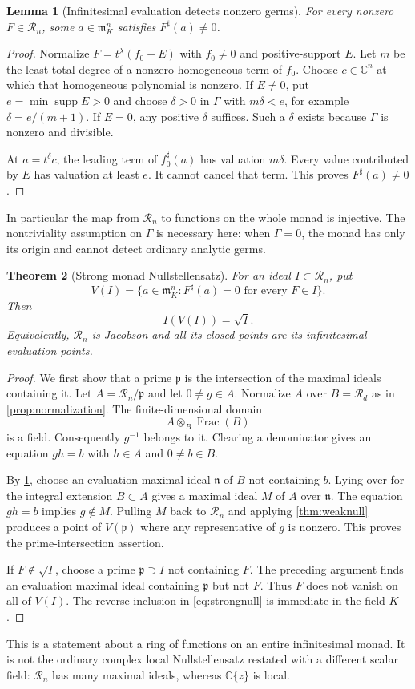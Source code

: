 \documentclass[11pt]{article}
\newtheorem{theorem}{Theorem}[section]
\newtheorem{lemma}[theorem]{Lemma}
\theoremstyle{definition}
\newcommand{\C}{\mathbb C}
\newcommand{\RR}{\mathscr R}
\newcommand{\mm}{\mathfrak m}
\newcommand{\pp}{\mathfrak p}
\newcommand{\supp}{\operatorname{supp}}
\newcommand{\Frac}{\operatorname{Frac}}
\newcommand{\sh}{^{\sharp}}
\begin{document}
\begin{lemma}[Infinitesimal evaluation detects nonzero germs]\label{lem:density}
For every nonzero $F\in\RR_n$, some $a\in\mm_K^n$ satisfies $F\sh(a)\ne0$.
\end{lemma}
\begin{proof}
Normalize $F=t^\lambda(f_0+E)$ with $f_0\ne0$ and positive-support $E$. Let $m$ be the least total degree of a nonzero homogeneous term of $f_0$. Choose $c\in\C^n$ at which that homogeneous polynomial is nonzero. If $E\ne0$, put $e=\min\supp E>0$ and choose $\delta>0$ in $\Gamma$ with $m\delta<e$, for example $\delta=e/(m+1)$. If $E=0$, any positive $\delta$ suffices. Such a $\delta$ exists because $\Gamma$ is nonzero and divisible.

At $a=t^\delta c$, the leading term of $f_0\sh(a)$ has valuation $m\delta$. Every value contributed by $E$ has valuation at least $e$. It cannot cancel that term. This proves $F\sh(a)\ne0$.
\end{proof}
In particular the map from $\RR_n$ to functions on the whole monad is injective. The nontriviality assumption on $\Gamma$ is necessary here: when $\Gamma=0$, the monad has only its origin and cannot detect ordinary analytic germs.

\begin{theorem}[Strong monad Nullstellensatz]\label{thm:strongnull}
For an ideal $I\subset\RR_n$, put
\[
 V(I)=\{a\in\mm_K^n:F\sh(a)=0\text{ for every }F\in I\}.
\]
Then
\begin{equation}\label{eq:strongnull}
 I(V(I))=\sqrt I.
\end{equation}
Equivalently, $\RR_n$ is Jacobson and all its closed points are its infinitesimal evaluation points.
\end{theorem}
\begin{proof}
We first show that a prime $\pp$ is the intersection of the maximal ideals containing it. Let $A=\RR_n/\pp$ and let $0\ne g\in A$. Normalize $A$ over $B=\RR_d$ as in \cref{prop:normalization}. The finite-dimensional domain
\[
 A\otimes_B\Frac(B)
\]
is a field. Consequently $g^{-1}$ belongs to it. Clearing a denominator gives an equation $gh=b$ with $h\in A$ and $0\ne b\in B$.

By \cref{lem:density}, choose an evaluation maximal ideal $\mathfrak n$ of $B$ not containing $b$. Lying over for the integral extension $B\subset A$ gives a maximal ideal $M$ of $A$ over $\mathfrak n$. The equation $gh=b$ implies $g\notin M$. Pulling $M$ back to $\RR_n$ and applying \cref{thm:weaknull} produces a point of $V(\pp)$ where any representative of $g$ is nonzero. This proves the prime-intersection assertion.

If $F\notin\sqrt I$, choose a prime $\pp\supset I$ not containing $F$. The preceding argument finds an evaluation maximal ideal containing $\pp$ but not $F$. Thus $F$ does not vanish on all of $V(I)$. The reverse inclusion in \eqref{eq:strongnull} is immediate in the field $K$.
\end{proof}
This is a statement about a ring of functions on an entire infinitesimal monad. It is not the ordinary complex local Nullstellensatz restated with a different scalar field: $\RR_n$ has many maximal ideals, whereas $\C\{z\}$ is local.
\end{document}
